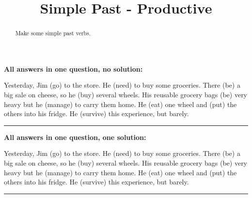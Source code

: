 \documentclass{ximera}
\title{Simple Past - Productive}
\begin{document}
\begin{abstract}
Make some simple past verbs.
\end{abstract}
\maketitle

\textbf{All answers in one question, no solution:}

\begin{question}
Yesterday, Jim  (go) to the store. He  (need) to buy some groceries. There  (be) a big sale on cheese, so he  (buy) several wheels. His reusable grocery bags  (be) very heavy but he  (manage) to carry them home. He  (eat) one wheel and  (put) the others into his fridge. He  (survive) this experience, but barely.

\end{question}

\rule{1cm}{1pt}

\begin{question}
\begin{solution}

\textbf{All answers in one question, one solution:}

Yesterday, Jim  (go) to the store. He  (need) to buy some groceries. There  (be) a big sale on cheese, so he  (buy) several wheels. His reusable grocery bags  (be) very heavy but he  (manage) to carry them home. He  (eat) one wheel and  (put) the others into his fridge. He  (survive) this experience, but barely.

\end{solution}
\end{question}

\rule{1cm}{1pt}
\end{document}
